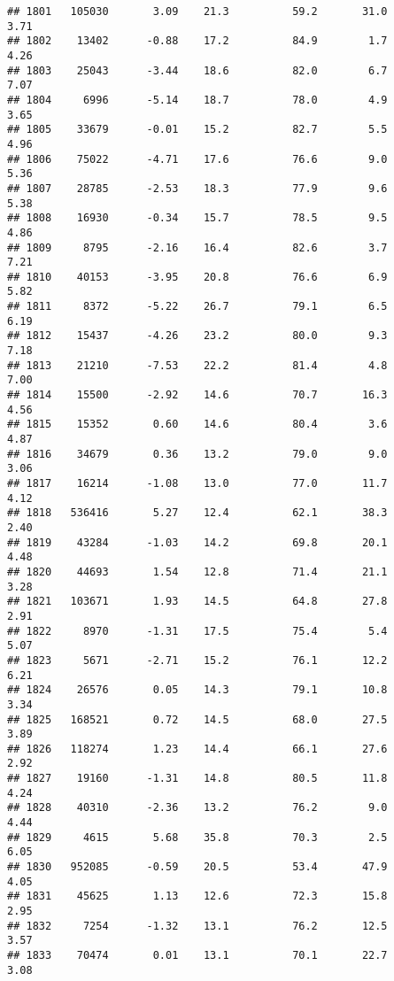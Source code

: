\documentclass[
]{article}
\begin{document}
\begin{verbatim}
## 1801   105030       3.09    21.3          59.2       31.0              3.71
## 1802    13402      -0.88    17.2          84.9        1.7              4.26
## 1803    25043      -3.44    18.6          82.0        6.7              7.07
## 1804     6996      -5.14    18.7          78.0        4.9              3.65
## 1805    33679      -0.01    15.2          82.7        5.5              4.96
## 1806    75022      -4.71    17.6          76.6        9.0              5.36
## 1807    28785      -2.53    18.3          77.9        9.6              5.38
## 1808    16930      -0.34    15.7          78.5        9.5              4.86
## 1809     8795      -2.16    16.4          82.6        3.7              7.21
## 1810    40153      -3.95    20.8          76.6        6.9              5.82
## 1811     8372      -5.22    26.7          79.1        6.5              6.19
## 1812    15437      -4.26    23.2          80.0        9.3              7.18
## 1813    21210      -7.53    22.2          81.4        4.8              7.00
## 1814    15500      -2.92    14.6          70.7       16.3              4.56
## 1815    15352       0.60    14.6          80.4        3.6              4.87
## 1816    34679       0.36    13.2          79.0        9.0              3.06
## 1817    16214      -1.08    13.0          77.0       11.7              4.12
## 1818   536416       5.27    12.4          62.1       38.3              2.40
## 1819    43284      -1.03    14.2          69.8       20.1              4.48
## 1820    44693       1.54    12.8          71.4       21.1              3.28
## 1821   103671       1.93    14.5          64.8       27.8              2.91
## 1822     8970      -1.31    17.5          75.4        5.4              5.07
## 1823     5671      -2.71    15.2          76.1       12.2              6.21
## 1824    26576       0.05    14.3          79.1       10.8              3.34
## 1825   168521       0.72    14.5          68.0       27.5              3.89
## 1826   118274       1.23    14.4          66.1       27.6              2.92
## 1827    19160      -1.31    14.8          80.5       11.8              4.24
## 1828    40310      -2.36    13.2          76.2        9.0              4.44
## 1829     4615       5.68    35.8          70.3        2.5              6.05
## 1830   952085      -0.59    20.5          53.4       47.9              4.05
## 1831    45625       1.13    12.6          72.3       15.8              2.95
## 1832     7254      -1.32    13.1          76.2       12.5              3.57
## 1833    70474       0.01    13.1          70.1       22.7              3.08

\end{verbatim}
\end{document}
